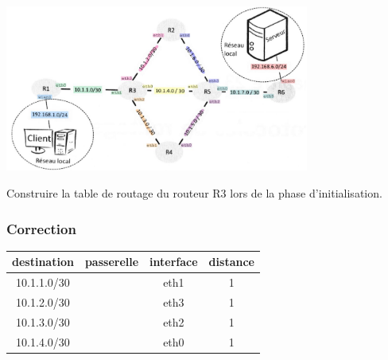\documentclass[svgnames,11pt]{beamer}
\begin{document}
\begin{frame}
    \frametitle{}
    \begin{center}
        \centering
        \includegraphics[width=10cm]{ressources/reseau.png}
        \label{reseau}
    \end{center}
    \begin{activite}
        Construire la table de routage du routeur R3 lors de la phase d'initialisation.
    \end{activite}

\end{frame}

\begin{frame}
    \frametitle{Correction}

    \begin{center}
        \begin{tabular}{|*{4}{c|}}
            \hline
            destination    & passerelle & interface & distance \\
            \hline
            10.1.1.0/30    &            & eth1      & 1        \\
            \hline
            10.1.2.0/30    &            & eth3      & 1        \\
            \hline
            10.1.3.0/30    &            & eth2      & 1        \\
            \hline
            10.1.4.0/30    &            & eth0      & 1        \\
            \hline
        \end{tabular}
    \end{center}

\end{frame}
\end{document}
